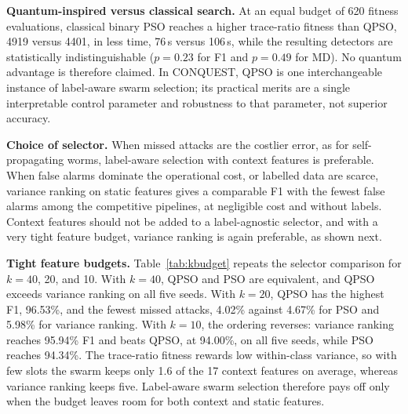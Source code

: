 \documentclass[conference]{IEEEtran}
\begin{document}
\textbf{Quantum-inspired versus classical
search.} At an equal budget of 620 fitness evaluations, classical
binary PSO reaches a higher trace-ratio fitness than QPSO, 4919
versus 4401, in less time, 76\,s versus 106\,s, while the resulting
detectors are statistically indistinguishable ($p=0.23$ for F1 and
$p=0.49$ for MD). No quantum advantage is therefore claimed. In
CONQUEST, QPSO is one interchangeable instance of label-aware swarm
selection; its practical merits are a single interpretable control
parameter and robustness to that parameter, not superior accuracy.

\textbf{Choice of selector.} When
missed attacks are the costlier error, as for self-propagating worms,
label-aware selection with context features is preferable. When false
alarms dominate the operational cost, or labelled data are scarce,
variance ranking on static features gives a comparable F1 with the
fewest false alarms among the competitive pipelines, at negligible
cost and without labels. Context features should not be added to a
label-agnostic selector, and with a very tight feature budget,
variance ranking is again preferable, as shown next.

\textbf{Tight feature budgets.}
Table~\ref{tab:kbudget} repeats the selector comparison for $k=40$, 20,
and 10. With $k=40$, QPSO and PSO are equivalent, and QPSO exceeds
variance ranking on all five seeds. With $k=20$, QPSO has the highest
F1, 96.53\%, and the fewest missed attacks, 4.02\% against 4.67\% for
PSO and 5.98\% for variance ranking. With $k=10$, the ordering
reverses: variance ranking reaches 95.94\% F1 and beats QPSO, at
94.00\%, on all five seeds, while PSO reaches 94.34\%. The trace-ratio
fitness rewards low within-class variance, so with few slots the
swarm keeps only 1.6 of the 17 context features on average, whereas
variance ranking keeps five. Label-aware swarm selection therefore
pays off only when the budget leaves room for both context and static
features.
\end{document}
